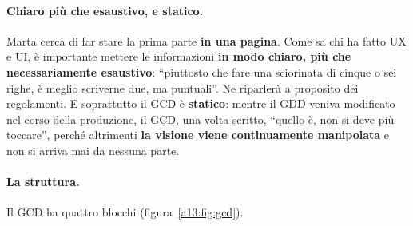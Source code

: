\paragraph{Chiaro più che esaustivo, e statico.} Marta cerca di far stare la prima parte
\textbf{in una pagina}. Come sa chi ha fatto UX e UI, è importante mettere le informazioni
\textbf{in modo chiaro, più che necessariamente esaustivo}: ``piuttosto che fare una
sciorinata di cinque o sei righe, è meglio scriverne due, ma puntuali''. Ne riparlerà a
proposito dei regolamenti. E soprattutto il GCD è \textbf{statico}: mentre il GDD veniva
modificato nel corso della produzione, il GCD, una volta scritto, ``quello è, non si deve
più toccare'', perché altrimenti \textbf{la visione viene continuamente manipolata} e non si
arriva mai da nessuna parte.

\paragraph{La struttura.} Il GCD ha quattro blocchi (figura~\ref{a13:fig:gcd}).
